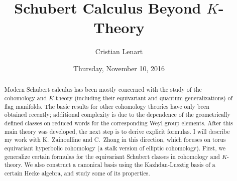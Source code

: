 \documentclass{UAmathtalk}
\author{Cristian Lenart}
\title{Schubert Calculus Beyond \(K\)-Theory}
\date{Thursday, November 10, 2016}
\begin{document}
\maketitle

\begin{abstract}
Modern Schubert calculus has been mostly concerned with the study of the cohomology and $K$-theory (including their equivariant and quantum generalizations) of flag manifolds. The basic results for other cohomology theories have only been obtained recently; additional complexity is due to the dependence of the geometrically defined classes on reduced words for the corresponding Weyl group elements. After this main theory was developed, the next step is to derive explicit formulas. I will describe my work with K.~Zainoulline and C.~Zhong in this direction, which focuses on torus equivariant hyperbolic cohomology (a stalk version of elliptic cohomology). First, we generalize certain formulas for the equivariant Schubert classes in cohomology and $K$-theory. We also construct a canonical basis using the Kazhdan-Lusztig basis of a certain Hecke algebra, and study some of its properties.
\end{abstract}
\end{document}
